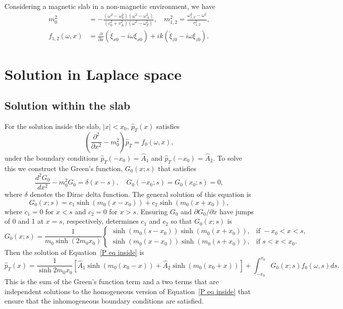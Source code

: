 \documentclass[12pt]{article}
\begin{document}
Considering a magnetic slab in a non-magnetic environment, we have
\begin{align}
m_0^2 &= - \frac{(\omega^2 - \omega_0^2)(\omega^2 - \omega_A^2)}{(c_0^2 + v_A^2)(\omega^2 - \omega_T^2)}, \quad m_{1,2}^2 = \frac{\omega_{1,2}^2 - \omega^2}{c_{1,2}^2}, \\
f_{1,2}(\omega,x) &= \frac{\partial}{\partial x} (\dot{\xi}_{x0} - i\omega\xi_{x0}) + ik(\dot{\xi}_{z0} - i\omega\xi_{z0}).
\end{align}


\section{Solution in Laplace space}

\subsection{Solution within the slab}
For the solution inside the slab, $|x| < x_0$, $\hat{p}_T(x)$ satisfies
\begin{equation}
\left( \frac{\partial^2}{\partial x^2} - m_0^2 \right) \hat{p}_T = f_0(\omega, x),
\end{equation}
under the boundary conditions $\hat{p}_T(-x_0) = \hat{A}_1$ and $\hat{p}_T(-x_0) = \hat{A}_2$. To solve this we construct the Green's function, $G_0(x;s)$ that satisfies
\begin{equation}
\frac{d^2G_0}{dx^2} - m_0^2 G_0 = \delta(x-s), \quad G_0(-x_0;s) = G_0(x_0;s) = 0,
\end{equation}
where $\delta$ denotes the Dirac delta function. The general solution of this equation is
\begin{equation}
G_0(x;s) = c_1\sinh(m_0(x - x_0)) + c_2\sinh(m_0(x + x_0)),
\end{equation}
where $c_1 = 0$ for $x < s$ and $c_2 = 0$ for $x > s$. Ensuring $G_0$ and $\partial G_0 / \partial x$ have jumps of 0 and 1 at $x = s$, respectively, determines $c_1$ and $c_2$ so that $G_0(x;s)$ is
\begin{equation}
G_0(x;s) = \frac{1}{m_0\sinh(2m_0 x_0)}
\begin{cases}
\sinh(m_0(s - x_0))\sinh(m_0(x + x_0)), & \text{if } -x_0<x<s, \\
\sinh(m_0(x - x_0))\sinh(m_0(s + x_0)), & \text{if } s<x<x_0.
\end{cases}
\end{equation}
Then the solution of Equation~\eqref{P eq inside} is
\begin{equation}
\hat{p}_T(x) = \frac{1}{\sinh{2m_0 x_0}} \left[ \hat{A}_1\sinh(m_0(x_0 - x)) + \hat{A}_2\sinh(m_0(x_0 + x)) \right] + \int_{-x_0}^{x_0} G_0(x;s) f_0(\omega, s) ds.
\label{P sol 0}
\end{equation}
This is the sum of the Green's function term and a two terms that are independent solutions to the homogeneous version of Equation~\eqref{P eq inside} that ensure that the inhomogeneous boundary conditions are satisfied.
\end{document}
